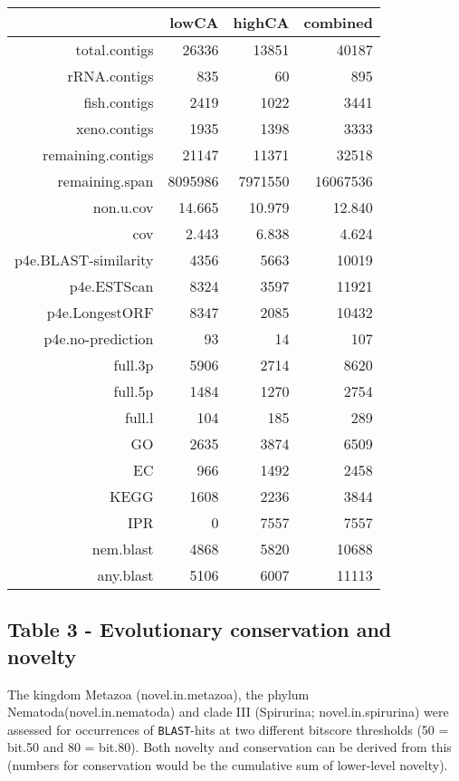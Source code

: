 \documentclass[10pt]{bmc_article}
\newenvironment{bmcformat}{\begin{raggedright}\baselineskip20pt\sloppy\setboolean{publ}{false}}{\end{raggedright}\baselineskip20pt\sloppy}
\begin{document}
\begin{bmcformat}
\begin{table}[ht]
\begin{center}
\begin{tabular}{rrrr}
  \hline
 & lowCA & highCA & combined \\ 
  \hline
total.contigs & 26336 & 13851 & 40187 \\ 
  rRNA.contigs & 835 & 60 & 895 \\ 
  fish.contigs & 2419 & 1022 & 3441 \\ 
  xeno.contigs & 1935 & 1398 & 3333 \\ 
  remaining.contigs & 21147 & 11371 & 32518 \\ 
  remaining.span & 8095986 & 7971550 & 16067536 \\ 
  non.u.cov & 14.665 & 10.979 & 12.840 \\ 
  cov & 2.443 & 6.838 & 4.624 \\ 
  p4e.BLAST-similarity & 4356 & 5663 & 10019 \\ 
  p4e.ESTScan & 8324 & 3597 & 11921 \\ 
  p4e.LongestORF & 8347 & 2085 & 10432 \\ 
  p4e.no-prediction & 93 & 14 & 107 \\ 
  full.3p & 5906 & 2714 & 8620 \\ 
  full.5p & 1484 & 1270 & 2754 \\ 
  full.l & 104 & 185 & 289 \\ 
  GO & 2635 & 3874 & 6509 \\ 
  EC & 966 & 1492 & 2458 \\ 
  KEGG & 1608 & 2236 & 3844 \\ 
  IPR & 0 & 7557 & 7557 \\ 
  nem.blast & 4868 & 5820 & 10688 \\ 
  any.blast & 5106 & 6007 & 11113 \\ 
   \hline
\end{tabular}
\end{center}
\end{table}
\subsection*{Table 3 - Evolutionary conservation and novelty}

The kingdom Metazoa (novel.in.metazoa), the phylum
Nematoda(novel.in.nematoda) and clade III (Spirurina;
novel.in.spirurina) were assessed for occurrences of \texttt{BLAST}-hits
at two different bitscore thresholds (50 = bit.50 and 80 = bit.80).
Both novelty and conservation can be derived from this (numbers for
conservation would be the cumulative sum of lower-level novelty).


\end{bmcformat}
\end{document}
